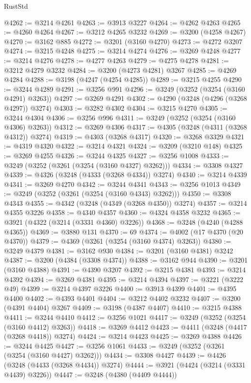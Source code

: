 \begin{lexlean}{RustStd}
\begin{coremodule}
{\begin{coremodule}
{{{{{{{{{{{{{{{{{{{{{{{{{@4262 := @3214 @4261
@4263 := @3913 @3227
@4264 := @4262 @4263
@4265 := @4260 @4264
@4267 := @3212 @4265 @3232
@4269 := @3200 (@4258 @4267)
@4270 := @3162 @885
@4272 := @3201 (@3160 @4270)
@4273 := @4272 @3207
@4274 := @3215 @4248
@4275 := @3214 @4274
@4276 := @3269 @4248
@4277 := @3214 @4276
@4278 := @4277 @4263
@4279 := @4275 @4278
@4281 := @3212 @4279 @3232
@4284 := @3200 (@4273 @4281) @3267
@4285 := @4269 @4284
@4288 := @3198 (@4247 (@4254 @4285))
@4289 := @3215 @4255
@4290 := @3244 @4289
@4291 := @3256 @991
@4296 := @3249 (@3252 (@3254 (@3160 @4291) @3263))
@4297 := @3269 @4291
@4302 := @4290 (@3248 (@4296 (@3268 @4297)) @3274)
@4303 := @3282 @4302
@4304 := @3215 @4270
@4305 := @3244 @4304
@4306 := @3256 @996
@4311 := @3249 (@3252 (@3254 (@3160 @4306) @3263))
@4312 := @3269 @4306
@4317 := @4305 (@3248 (@4311 (@3268 @4312)) @3274)
@4319 := @4303 (@3268 @4317)
@4320 := @3268 @3329
@4321 := @4319 @4320
@4322 := @3214 @4321
@4324 := @3209 (@3210 @148)
@4325 := @3269 @4255
@4326 := @3244 @4325
@4327 := @3256 @1008
@4333 := @3249 (@3252 (@3261 (@3254 (@3160 @4327) @3262)))
@4334 := @3308 @4327
@4339 := @4326 (@3248 (@4333 (@3268 @4334)) @3274)
@4340 := @3214 @4339
@4341 := @3269 @4270
@4342 := @3244 @4341
@4343 := @3256 @1013
@4349 := @3249 (@3252 (@3261 (@3254 (@3160 @4343) @3262)))
@4350 := @3308 @4343
@4355 := @4342 (@3248 (@4349 (@3268 @4350)) @3274)
@4357 := @3214 @4355 @3226
@4358 := @4340 @4357
@4360 := @4324 @4358 @3232
@4365 := @3921 (@4322 (@3214 (@3331 @4360) @3226))
@4368 := @3248 (@4240 (@4288 @4365))
@4369 := @3880 @131
@4370 := 69
@4374 := @4002 (@17 @4370 (@20 @4370))
@4379 := @4369 (@3261 (@3254 (@3160 @4374) @3263))
@4380 := @3249 @4379
@4381 := @3162 @930
@4384 := @3201 (@3160 @4381) @3242
@4387 := @3200 (@4384 (@3308 @4374))
@4388 := @3162 @944
@4390 := @3201 (@3160 @4388)
@4391 := @4390 @3207
@4392 := @3215 @4381
@4393 := @3214 @4392
@4394 := @3269 @4381
@4395 := @3214 @4394
@4397 := @3221 (@3222 @49)
@4399 := @3214 @4397 @3226
@4400 := @3913 @4399
@4401 := @4395 @4400
@4402 := @4393 @4401
@4404 := @3212 @4402 @3232
@4407 := @3200 (@4391 @4404) @3267
@4409 := @3198 (@4387 @4407)
@4410 := @3215 @4388
@4411 := @3244 @4410
@4412 := @3256 @1021
@4417 := @3249 (@3252 (@3254 (@3160 @4412) @3263))
@4418 := @3269 @4412
@4423 := @4411 (@3248 (@4417 (@3268 @4418)) @3274)
@4424 := @3214 @4423
@4425 := @3269 @4388
@4426 := @3244 @4425
@4427 := @3256 @1061
@4433 := @3249 (@3252 (@3261 (@3254 (@3160 @4427) @3262)))
@4434 := @3308 @4427
@4439 := @4426 (@3248 (@4433 (@3268 @4434)) @3274)
@4444 := @3921 (@4424 (@3214 (@3331 @4439) @3226))
@4447 := @3248 (@4380 (@4409 @4444))
}}}}}}}}}}}}}}}}}}}}}}}}}
\end{coremodule}}
\end{coremodule}
\end{lexlean}
